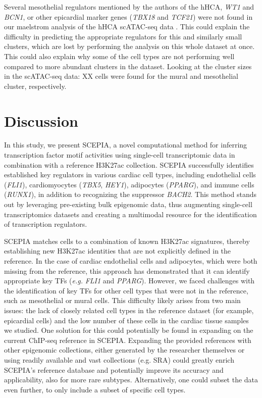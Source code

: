 Several mesothelial regulators mentioned by the authors of the hHCA, \textit{WT1} and \textit{BCN1}, or other epicardial marker genes (\textit{TBX18} and \textit{TCF21}) were not found in our maelstrom analysis of the hHCA scATAC-seq data \cite{Wu2013}. This could explain the difficulty in predicting the appropriate regulators for this and similarly small clusters, which are lost by performing the analysis on this whole dataset at once. This could also explain why some of the cell types are not performing well compared to more abundant clusters in the dataset. Looking at the cluster sizes in the scATAC-seq data: XX cells were found for the mural and mesothelial cluster, respectively.

\section{Discussion}

In this study, we present SCEPIA, a novel computational method for inferring transcription factor motif activities using single-cell transcriptomic data in combination with a reference H3K27ac collection. SCEPIA successfully identifies established key regulators in various cardiac cell types, including endothelial cells (\textit{FLI1}), cardiomyocytes (\textit{TBX5}, \textit{HEY1}), adipocytes (\textit{PPARG}), and immune cells (\textit{RUNX1}), in addition to recognizing the suppressor \textit{BACH2}. This method stands out by leveraging pre-existing bulk epigenomic data, thus augmenting single-cell transcriptomics datasets and creating a multimodal resource for the identification of transcription regulators.

SCEPIA matches cells to a combination of known H3K27ac signatures, thereby establishing new H3K27ac identities that are not explicitly defined in the reference. In the case of cardiac endothelial cells and adipocytes, which were both missing from the reference, this approach has demonstrated that it can identify appropriate key TFs (\textit{e.g.} \textit{FLI1} and \textit{PPARG}). However, we faced challenges with the identification of key TFs for other cell types that were not in the reference, such as mesothelial or mural cells. This difficulty likely arises from two main issues: the lack of closely related cell types in the reference dataset (for example, epicardial cells) and the low number of these cells in the cardiac tissue samples we studied. One solution for this could potentially be found in expanding on the current ChIP-seq reference in SCEPIA. Expanding the provided references with other epigenomic collections, either generated by the researcher themselves or using readily available and vast collections (e.g. SRA) could greatly enrich SCEPIA's reference database and potentially improve its accuracy and applicability, also for more rare subtypes. Alternatively, one could subset the data even further, to only include a subset of specific cell types. 

